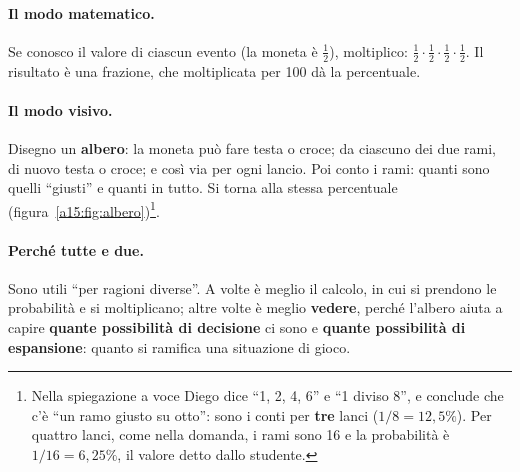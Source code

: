 \paragraph{Il modo matematico.} Se conosco il valore di ciascun evento (la moneta è
$\tfrac12$), moltiplico: $\tfrac12 \cdot \tfrac12 \cdot \tfrac12 \cdot \tfrac12$. Il
risultato è una frazione, che moltiplicata per 100 dà la percentuale.

\paragraph{Il modo visivo.} Disegno un \textbf{albero}: la moneta può fare testa o croce; da
ciascuno dei due rami, di nuovo testa o croce; e così via per ogni lancio. Poi conto i rami:
quanti sono quelli ``giusti'' e quanti in tutto. Si torna alla stessa percentuale
(figura~\ref{a15:fig:albero})\footnote{Nella spiegazione a voce Diego dice ``1, 2, 4, 6'' e
``1 diviso 8'', e conclude che c'è ``un ramo giusto su otto'': sono i conti per
\textbf{tre} lanci ($1/8 = 12{,}5\%$). Per quattro lanci, come nella domanda, i rami sono 16
e la probabilità è $1/16 = 6{,}25\%$, il valore detto dallo studente.}.

\paragraph{Perché tutte e due.} Sono utili ``per ragioni diverse''. A volte è meglio il
calcolo, in cui si prendono le probabilità e si moltiplicano; altre volte è meglio
\textbf{vedere}, perché l'albero aiuta a capire \textbf{quante possibilità di decisione} ci
sono e \textbf{quante possibilità di espansione}: quanto si ramifica una situazione di
gioco.

